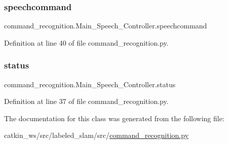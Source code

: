 \subsubsection{\texorpdfstring{speechcommand}{speechcommand}}
{\footnotesize\ttfamily command\+\_\+recognition.\+Main\+\_\+\+Speech\+\_\+\+Controller.\+speechcommand}



Definition at line 40 of file command\+\_\+recognition.\+py.

\mbox{\label{classcommand__recognition_1_1_main___speech___controller_a7b8c9320db0e9e052e46d7261914aa1f}} 
\subsubsection{\texorpdfstring{status}{status}}
{\footnotesize\ttfamily command\+\_\+recognition.\+Main\+\_\+\+Speech\+\_\+\+Controller.\+status}



Definition at line 37 of file command\+\_\+recognition.\+py.



The documentation for this class was generated from the following file\+:\begin{DoxyCompactItemize}
\item 
catkin\+\_\+ws/src/labeled\+\_\+slam/src/\hyperlink{command__recognition_8py}{command\+\_\+recognition.\+py}\end{DoxyCompactItemize}
